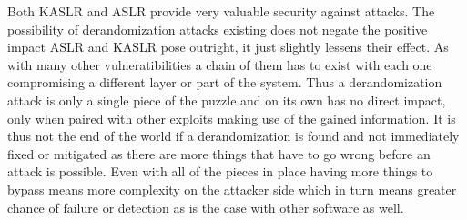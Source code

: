 Both KASLR and ASLR provide very valuable security against attacks.
The possibility of derandomization attacks existing does not negate the positive impact ASLR and KASLR pose outright, it just slightly lessens their effect.
As with many other vulneratibilities a chain of them has to exist with each one compromising a different layer or part of the system.
Thus a derandomization attack is only a single piece of the puzzle and on its own has no direct impact, only when paired with other exploits making use of the gained information.
It is thus not the end of the world if a derandomization is found and not immediately fixed or mitigated as there are more things that have to go wrong before an attack is possible.
Even with all of the pieces in place having more things to bypass means more complexity on the attacker side which in turn means greater chance of failure or detection as is the case with other software as well.
